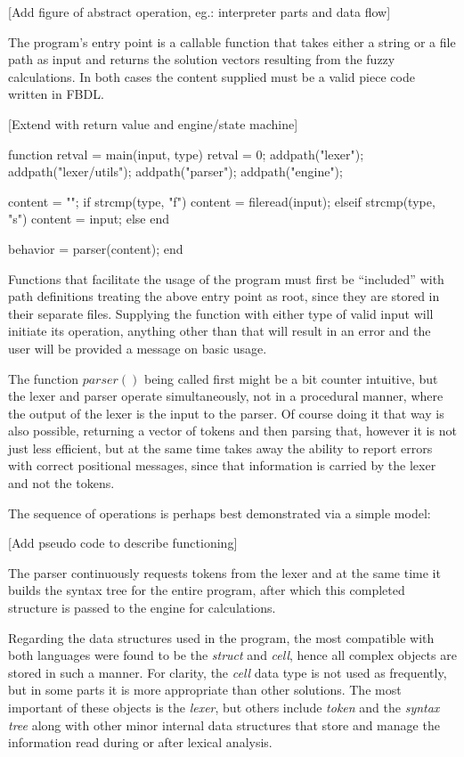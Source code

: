[Add figure of abstract operation, eg.: interpreter parts and data flow]


The program's entry point is a callable function that takes either a string or a file path as input and returns the solution vectors resulting from the fuzzy calculations. In both cases the content supplied must be a valid piece code written in FBDL. 

[Extend with return value and engine/state machine]
\begin{octave}
function retval = main(input, type)
  retval = 0;
  addpath("lexer");
  addpath("lexer/utils");
  addpath("parser");
  addpath("engine");

  content =  "";
  if strcmp(type, "f")
    content = fileread(input);
  elseif strcmp(type, "s")
    content = input;
  else
  end

  behavior = parser(content);
end
\end{octave}

Functions that facilitate the usage of the program must first be ``included'' with path definitions treating the above entry point as root, since they are stored in their separate files. Supplying the function with either type of valid input will initiate its operation, anything other than that will result in an error and the user will be provided a message on basic usage.

The function $parser()$ being called first might be a bit counter intuitive, but the lexer and parser operate simultaneously, not in a procedural manner, where the output of the lexer is the input to the parser. Of course doing it that way is also possible, returning a vector of tokens and then parsing that, however it is not just less efficient, but at the same time takes away the ability to report errors with correct positional messages, since that information is carried by the lexer and not the tokens.

The sequence of operations is perhaps best demonstrated via a simple model:

[Add pseudo code to describe functioning]

The parser continuously requests tokens from the lexer and at the same time it builds the syntax tree for the entire program, after which this completed structure is passed to the engine for calculations.

Regarding the data structures used in the program, the most compatible with both languages were found to be the \textit{struct} and \textit{cell}, hence all complex objects are stored in such a manner. For clarity,  the \textit{cell} data type is not used as frequently, but in some parts it is more appropriate than other solutions. The most important of these objects is the \textit{lexer}, but others include \textit{token} and the \textit{syntax tree} along with other minor internal data structures that store and manage the information read during or after lexical analysis.

